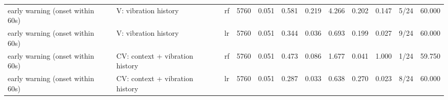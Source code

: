 \begin{tabular}{llllllllllll}
early warning (onset within 60s) & V: vibration history & rf & 5760 & 0.051 & 0.581 & 0.219 & 4.266 & 0.202 & 0.147 & 5/24 & 60.000 \\
early warning (onset within 60s) & V: vibration history & lr & 5760 & 0.051 & 0.344 & 0.036 & 0.693 & 0.199 & 0.027 & 9/24 & 60.000 \\
early warning (onset within 60s) & CV: context + vibration history & rf & 5760 & 0.051 & 0.473 & 0.086 & 1.677 & 0.041 & 1.000 & 1/24 & 59.750 \\
early warning (onset within 60s) & CV: context + vibration history & lr & 5760 & 0.051 & 0.287 & 0.033 & 0.638 & 0.270 & 0.023 & 8/24 & 60.000 \\
\bottomrule
\end{tabular}
